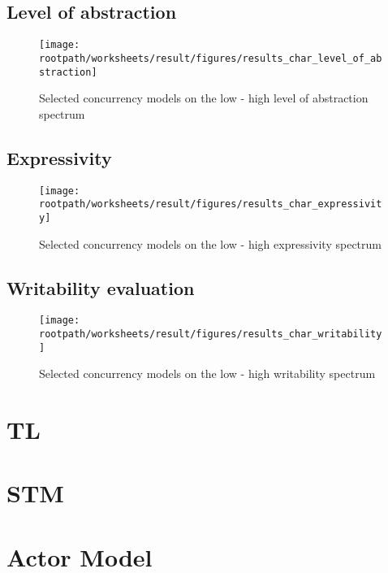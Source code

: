 \subsection{Level of abstraction}

\begin{figure}[htbp]
\centering
 \texttt{[image: \\rootpath/worksheets/result/figures/results\_char\_level\_of\_abstraction]} 
 \caption{Selected concurrency models on the low - high level of abstraction spectrum}
\label{fig:results_char_level_of_abstraction}
\end{figure}

\subsection{Expressivity}

\begin{figure}[htbp]
\centering
 \texttt{[image: \\rootpath/worksheets/result/figures/results\_char\_expressivity]} 
 \caption{Selected concurrency models on the low - high expressivity spectrum}
\label{fig:results_char_expressivity}
\end{figure}

\subsection{Writability evaluation}

\begin{figure}[htbp]
\centering
 \texttt{[image: \\rootpath/worksheets/result/figures/results\_char\_writability]} 
 \caption{Selected concurrency models on the low - high writability spectrum}
\label{fig:results_char_writability}
\end{figure}

\section{\acl{TL}}
\section{\acl{STM}}
\section{Actor Model}
\worksheetend
